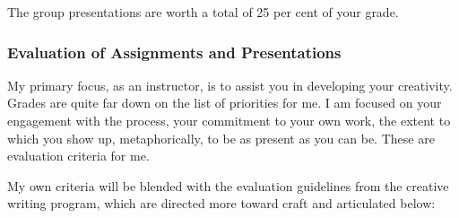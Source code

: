 \documentclass[10pt,DIV09,letterpaper,oneside,headsepline]{scrreprt}
\begin{document}
The group presentations are worth a total of 25 per cent of your grade.

\subsubsection{Evaluation of Assignments and Presentations}
My primary focus, as an instructor, is to assist you in developing
your creativity. Grades are quite far down on the list of priorities
for me. I am focused on your engagement with the process, your
commitment to your own work, the extent to which you show up,
metaphorically, to be as present as you can be. These are evaluation
criteria for me.

My own criteria will be blended with the evaluation guidelines from
the creative writing program, which are directed more toward craft and
articulated below:
\end{document}
